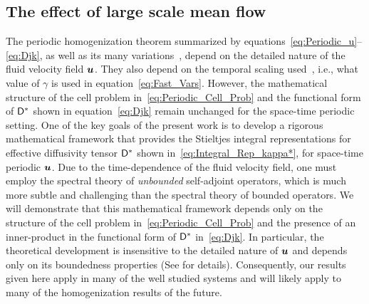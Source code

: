 \documentclass[amsa]{ipart}
\begin{document}
\subsection{The effect of large scale mean flow}\label{sec:Mean_Flow}
%
The periodic homogenization theorem summarized by
equations~\eqref{eq:Periodic_u}--\eqref{eq:Djk}, as well as its many
variations~\cite{Bensoussan:Book:1978,Papanicolaou:1981:36:8,Bhattacharya:1985:AnnProb:13:2:385,Bhattacharya:1989:ASD,McLaughlin:SIAM_JAM:780,Avellaneda:CMP-339,Pavliotis:PHD_Thesis,Pavliotis:IMAJAM:951,Pavliotis:CMS:2007:507,McLaughlin:Forest:PF:1999:880,Majda:Kramer:1999:book}, 
depend on the detailed nature of the fluid velocity field
$\boldsymbol{u}$. They also depend on the temporal scaling
used~\cite{Bhattacharya:1989:ASD,Pavliotis:PHD_Thesis,Majda:Kramer:1999:book},
i.e., what value of $\gamma$ is used in
equation~\eqref{eq:Fast_Vars}. However, the mathematical structure of
the cell problem in~\eqref{eq:Periodic_Cell_Prob} and the functional
form of $\mathsf{D}^*$ shown in equation~\eqref{eq:Djk} remain
unchanged for the space-time periodic setting. One of the key goals of
the present work is to develop a rigorous mathematical framework that
provides the Stieltjes integral representations for effective diffusivity
tensor $\mathsf{D}^*$ shown in~\eqref{eq:Integral_Rep_kappa*}, for
space-time periodic $\boldsymbol{u}$. Due to the time-dependence of the fluid
velocity field, one must employ the spectral theory of
\emph{unbounded} self-adjoint operators, which is much more
subtle and challenging than the spectral theory of bounded
operators. We will demonstrate that this mathematical framework
depends only on the 
structure of the cell problem in~\eqref{eq:Periodic_Cell_Prob} and the
presence of an inner-product in the functional form of $\mathsf{D}^*$
in~\eqref{eq:Djk}. In particular, the theoretical development is 
insensitive to the detailed nature of $\boldsymbol{u}$ and depends only
on its boundedness properties (See  for
details). Consequently, our results given here apply in many of the
well studied systems and will likely apply to many of the
homogenization results of the future.          
\end{document}

